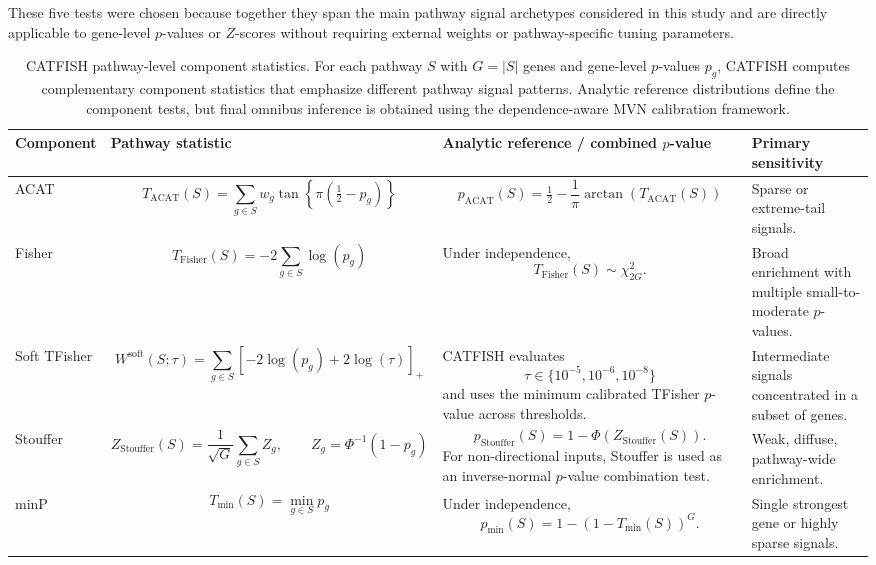\documentclass[unnumsec,webpdf,contemporary,large]{oup-authoring-template}%
\theoremstyle{thmstyleone}%
\theoremstyle{thmstyletwo}%
\theoremstyle{thmstylethree}%
\begin{document}
These five tests were chosen because together they span the main pathway signal archetypes considered in this study and are directly applicable to gene-level $p$-values or $Z$-scores without requiring external weights or pathway-specific tuning parameters.

\begin{table}[!t]
\centering
\caption{CATFISH pathway-level component statistics.
For each pathway \(S\) with \(G=|S|\) genes and gene-level \(p\)-values \(p_g\), CATFISH computes complementary component statistics that emphasize different pathway signal patterns. Analytic reference distributions define the component tests, but final omnibus inference is obtained using the dependence-aware MVN calibration framework.}
\label{tab:catfish_component_statistics}
\small
\renewcommand{\arraystretch}{1.25}
\begin{tabular}{p{} p{} p{} p{}}
\hline
\textbf{Component} & \textbf{Pathway statistic} & \textbf{Analytic reference / combined \(p\)-value} & \textbf{Primary sensitivity} \\
\hline

ACAT &
\[
T_{\mathrm{ACAT}}(S)=
\sum_{g\in S} w_g \tan\left\{\pi\left(\tfrac{1}{2}-p_g\right)\right\}
\]
&
\[
p_{\mathrm{ACAT}}(S)=
\tfrac{1}{2}-\frac{1}{\pi}\arctan\left(T_{\mathrm{ACAT}}(S)\right)
\]
&
Sparse or extreme-tail signals. \\

Fisher &
\[
T_{\mathrm{Fisher}}(S)=
-2\sum_{g\in S}\log(p_g)
\]
&
Under independence,
\[
T_{\mathrm{Fisher}}(S)\sim\chi^2_{2G}.
\]
&
Broad enrichment with multiple small-to-moderate \(p\)-values. \\

Soft TFisher &
\[
W^{\mathrm{soft}}(S;\tau)=
\sum_{g\in S}
\left[-2\log(p_g)+2\log(\tau)\right]_+
\]
&
CATFISH evaluates
\[
\tau\in\{10^{-5},10^{-6},10^{-8}\}
\]
and uses the minimum calibrated TFisher \(p\)-value across thresholds. &
Intermediate signals concentrated in a subset of genes. \\

Stouffer &
\[
Z_{\mathrm{Stouffer}}(S)=
\frac{1}{\sqrt{G}}\sum_{g\in S} Z_g,
\qquad
Z_g=\Phi^{-1}(1-p_g)
\]
&
\[
p_{\mathrm{Stouffer}}(S)=
1-\Phi\left(Z_{\mathrm{Stouffer}}(S)\right).
\]
For non-directional inputs, Stouffer is used as an inverse-normal \(p\)-value combination test. &
Weak, diffuse, pathway-wide enrichment. \\

minP &
\[
T_{\min}(S)=\min_{g\in S}p_g
\]
&
Under independence,
\[
p_{\min}(S)=
1-\left(1-T_{\min}(S)\right)^G.
\]
&
Single strongest gene or highly sparse signals. \\

\hline
\end{tabular}
\end{table}
\end{document}
